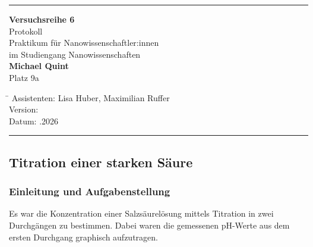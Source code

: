 \documentclass[
	a4paper,										%
	12pt,											%
	twoside,										%
	headsepline,								%
	footsepline,									%
	captions=tableheading,					%
]{scrartcl}
\begin{document}
	
	\begin{titlepage}
		\begin{center}
			\hrule													%
			\vspace*{5cm}
			\Huge {\textbf {Versuchsreihe 6}}\\						%
			\vspace*{0.5cm}
			\vspace*{1cm}
			\normalsize
			Protokoll	\\									
			Praktikum für Nanowissenschaftler:innen\\
			im Studiengang Nanowissenschaften\\
			\vspace*{0.5cm}
			\Large {\textbf{Michael Quint}}		\\						%
			\vspace*{0.5cm}
					\normalsize{Platz 9a}								%
			\vfill
		\end{center}
		\begin{tabbing}
			\hspace{3cm}\=\kill
			Assistenten: \> Lisa Huber, Maximilian Ruffer \\						%
			Version:  \\									%
			Datum: .2026 \\								%
		\end{tabbing}
		\hrule														%
\end{titlepage}

\setcounter{page}{1}
\setcounter{section}{6}								%
\setcounter{subsection}{2}							%
\setcounter{secnumdepth}{4}
	
\subsection{Titration einer starken Säure}

\subsubsection{Einleitung und Aufgabenstellung}

Es war die Konzentration einer Salzsäurelösung mittels Titration in zwei Durchgängen zu bestimmen.
Dabei waren die gemessenen pH-Werte aus dem ersten Durchgang graphisch aufzutragen.
\end{document}
